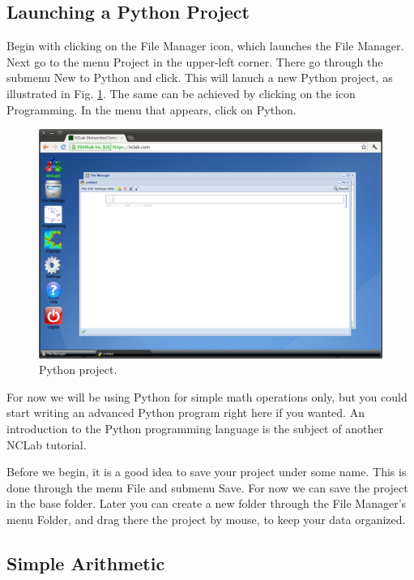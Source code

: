 \documentclass[article,A4,12pt]{llncs}
\begin{document}
\subsection{Launching a Python Project}

Begin with clicking on the File Manager icon, which launches the File 
Manager. Next go to the menu Project in the upper-left corner. There go 
through the submenu New to Python and click. This will lanuch a new Python 
project, as illustrated in Fig. \ref{fig:python}. The same can be achieved
by clicking on the icon Programming. In the menu that appears, click on 
Python. 

\newpage

\begin{figure}[!ht]
\begin{center}
\includegraphics[width=\textwidth]{img/python.png}
\end{center}
\caption{Python project.}
\label{fig:python}
\end{figure}
\noindent
For now we will be using Python for simple math operations only,
but you could start writing an advanced Python program right 
here if you wanted. An introduction to the Python programming 
language is the subject of another NCLab tutorial.

Before we begin, it is a good idea to save your project under some 
name. This is done through the menu File and submenu Save. For 
now we can save the project in the base folder. Later you can create 
a new folder through the File Manager's menu Folder, and drag there
the project by mouse, to keep your data organized.

\subsection{Simple Arithmetic}
\end{document}
